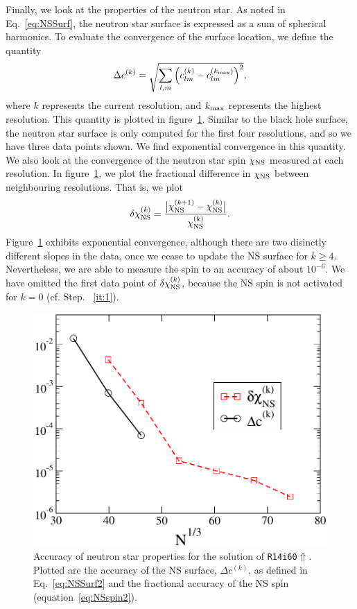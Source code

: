 Finally, we look at the properties of the neutron star. As noted in Eq.~\ref{eq:NSSurf},
the neutron star surface is expressed as a sum of spherical
harmonics.
To evaluate the convergence of the surface location, we define the
quantity
\begin{equation}
\label{eq:NSSurf2}
\Delta c^{(k)}=\sqrt{\sum_{l,m}
\left(c_{lm}^{(k)}-c^{(k_{\rm max})}_{lm}\right)^2},
\end{equation}
where $k$ represents the current resolution, and $k_{\rm max}$ represents the
highest resolution. This quantity is plotted in
figure~\ref{fig:SpinDiff}. Similar to the black hole surface, the
neutron star surface is only computed for the first four resolutions,
and so we have three data points shown. We find exponential
convergence in this quantity. We also look at the convergence of the
neutron star spin $\chi_{\rm NS}$ measured at each resolution. In
figure~\ref{fig:SpinDiff}, we plot the fractional difference in
$\chi_{\rm NS}$ between neighbouring resolutions. That is, we plot
\begin{equation}\label{eq:NSspin2}
\delta\chi^{(k)}_{\rm NS}=\frac{\big| \chi^{(k+1)}_{\rm NS}-\chi^{(k)}_{\rm NS} \big|}{\chi^{(k)}_{\rm NS}}.
\end{equation}
Figure~\ref{fig:SpinDiff} exhibits exponential convergence, although
there are two disinctly different slopes in the data, once we cease to
update the NS surface for $k\ge 4$. Nevertheless, we are able to
measure the spin to an accuracy of about $10^{-6}$. We have omitted
the first data point of $\delta\chi^{(k)}_{\rm NS}$, because the 
NS spin is not activated for $k=0$ (cf. Step.~ \ref{it:1}).


\begin{figure}
\centerline{\includegraphics[scale=0.95]{chap4/SpinDiff}}
\caption[Neutron star surface and spin accuracy.]{\label{fig:SpinDiff}
  Accuracy of neutron star properties for the solution of {\tt R14i60$\Uparrow$}. Plotted are the accuracy of the
  NS surface, $\Delta c^{(k)}$, as defined in Eq.~\ref{eq:NSSurf2} and
  the fractional accuracy of the NS spin (equation~\ref{eq:NSspin2}).
}
\end{figure}

